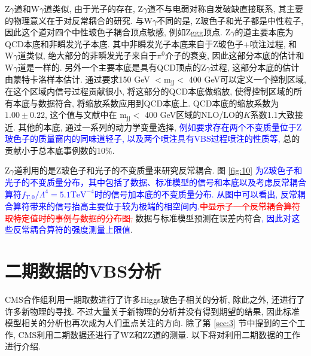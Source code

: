 \documentclass{SCIS2020cn}
\newcommand{\Wboson}{\text{W}}
\newcommand{\Zboson}{\text{Z}}
\newcommand{\mass}{\text{m}}
\newcommand{\add}{\textcolor{blue}}
\newcommand{\rmv}[1]{\textcolor{red}{\sout{#1}}}
\begin{document}
$\Zboson\gamma$道和$\Wboson\gamma$道类似, 由于光子的存在, $\Zboson\gamma$道不与电弱对称自发破缺直接联系, 其主要的物理意义在于对反常耦合的研究. 与$\Wboson\gamma$不同的是, Z玻色子和光子都是中性粒子, 因此这个道对四个中性玻色子耦合顶点敏感, 例如Zggg顶点. $\Zboson\gamma$的道主要本底为QCD本底和非瞬发光子本底. 其中非瞬发光子本底来自于Z玻色子+喷注过程, 和$\Wboson\gamma$道类似, 绝大部分的非瞬发光子来自于$\pi^0$介子的衰变, 因此这部分本底的估计和$\Wboson\gamma$道是一样的. 另外一个主要本底是具有QCD顶点的$\Zboson\gamma$过程, 这部分本底的估计由蒙特卡洛样本估计. 通过要求150 GeV $< \mass_{\text{jj}} < $ 400 GeV可以定义一个控制区域, 在这个区域内信号过程贡献很小, 将这部分的QCD本底做缩放, 使得控制区域的所有本底与数据符合, 将缩放系数应用到QCD本底上. QCD本底的缩放系数为$1.00\pm0.22$, 这个值与文献中在 $\mass_{\text{jj}} <$ 400 GeV区域的NLO/LO的$K$系数1.1大致接近. 其他的本底, 通过一系列的动力学变量选择, \add{例如要求存在两个不变质量位于$\Zboson$玻色子的质量窗内的同味道轻子, 以及两个喷注具有VBS过程喷注的性质等,} 总的贡献小于总本底事例数的10\%. 

$\Zboson\gamma$道利用的是Z玻色子和光子的不变质量来研究反常耦合. 图 \ref{fig:10} \add{为Z玻色子和光子的不变质量分布，其中包括了数据、标准模型的信号和本底以及考虑反常耦合算符$f_{T,0}/\Lambda^4=5.1 \text{TeV}^{-4}$时的信号加本底的不变质量分布. 从图中可以看出, 反常耦合算符带来的信号抬高主要位于较为极端的相空间内.}\rmv{中显示了一个反常耦合算符取特定值时的事例与数据的分布图,} 数据与标准模型预测在误差内符合\add{, 因此对这些反常耦合算符的强度测量上限值}.

\section{二期数据的VBS分析}

CMS合作组利用一期取数进行了许多Higgs玻色子相关的分析, 除此之外, 还进行了许多新物理的寻找. 不过大量关于新物理的分析并没有得到期望的结果, 因此标准模型相关的分析也再次成为人们重点关注的方向. 除了第 \ref{sec:3} 节中提到的三个工作, CMS利用二期数据还进行了WZ和ZZ道的测量. 以下将对利用二期数据的工作进行介绍. 
\end{document}
